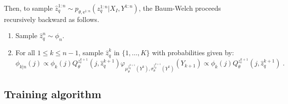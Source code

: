 \documentclass{article}
\newcommand{\eqsp}{\;}
\newcommand{\rme}{\mathrm{e}}
\begin{document}
Then, to sample $\hat z_q^{1:n} \sim p_{\theta,\rme^{1:n}}(z_q^{1:n}|X_I,Y^{1:n})$, the Baum-Welch proceeds recursively backward as follows.
\begin{enumerate}
\item Sample $\hat z_q^{n} \sim \phi_{n}$.
\item For all  $1\leqslant k \leqslant n-1$, sample $\hat z_q^{k}$ in $\{1,\ldots,K\}$ with probabilities given by:
$$
\phi_{k|n}(j)  \propto \phi_{k}(j)  Q^{z_\rme^{k+1}}_{\theta}(j,\hat z_q^{k+1}) \varphi_{\mu^{\hat z_q^{k+1}}_\theta\!\!\!\!\!(Y^{k}),\sigma^{\hat z_q^{k+1}}_\theta\!\!\!\!\!(Y^{k})}(Y_{k+1}) \propto \phi_{k}(j)  Q^{z_\rme^{k+1}}_{\theta}(j,\hat z_q^{k+1})\eqsp.
$$
\end{enumerate}

\subsection{Training algorithm}
%
%
\end{document}
